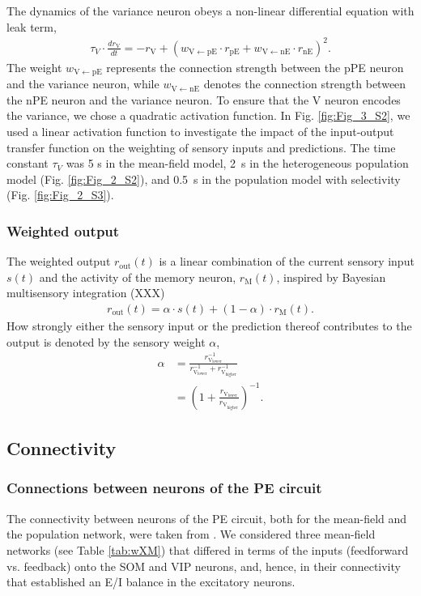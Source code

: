 \documentclass[10pt,a4paper,draft]{article}
\begin{document}
The dynamics of the variance neuron obeys a non-linear differential equation with leak term,
%
\begin{align}
\tau_V \cdot \frac{dr_\mathrm{V}}{dt} = -r_\mathrm{V} + (w_\mathrm{V\leftarrow pE} \cdot r_\mathrm{pE} + w_\mathrm{V\leftarrow nE} \cdot r_\mathrm{nE})^2.
\end{align}
%
The weight $w_\mathrm{V\leftarrow pE}$ represents the connection strength between the pPE neuron and the variance neuron, while  $w_\mathrm{V\leftarrow nE}$ denotes the connection strength between the nPE neuron and the variance neuron. To ensure that the V neuron encodes the variance, we chose a quadratic activation function. In Fig. \ref{fig:Fig_3_S2}, we used a linear activation function to investigate the impact of the input-output transfer function on the weighting of sensory inputs and predictions. The time constant $\tau_V$ was 5 s in the mean-field model, 2~s in the heterogeneous population model (Fig. \ref{fig:Fig_2_S2}), and 0.5~s in the population model with selectivity (Fig. \ref{fig:Fig_2_S3}).

\subsubsection{Weighted output}
%
The weighted output $r_\mathrm{out}(t) $ is a linear combination of the current sensory input $s(t)$ and the activity of the memory neuron, $r_\mathrm{M}(t)$, inspired by Bayesian multisensory integration (XXX)
%
\begin{align}
r_\mathrm{out}(t) = \alpha \cdot s(t) + (1-\alpha) \cdot r_\mathrm{M}(t).
\end{align}
%
How strongly either the sensory input or the prediction thereof contributes to the output is denoted by the sensory weight $\alpha$,
%
\begin{align}
\alpha &= \frac{r_\mathrm{V_{lower}}^{-1}}{r_\mathrm{V_{lower}}^{-1} + r_\mathrm{V_{higher}}^{-1}}\nonumber\\
& = \left( 1 + \frac{r_\mathrm{V_{lower}}}{r_\mathrm{V_{higher}}} \right)^{-1}.
\end{align}

\subsection{Connectivity}
%
%
\subsubsection{Connections between neurons of the PE circuit}
%
The connectivity between neurons of the PE circuit, both for the mean-field and the population network, were taken from \citep{hertag2022prediction}. We considered three mean-field networks (see Table \ref{tab:wXM}) that differed in terms of the inputs (feedforward vs. feedback) onto the SOM and VIP neurons, and, hence, in their connectivity that established an E/I balance in the excitatory neurons.
\end{document}
